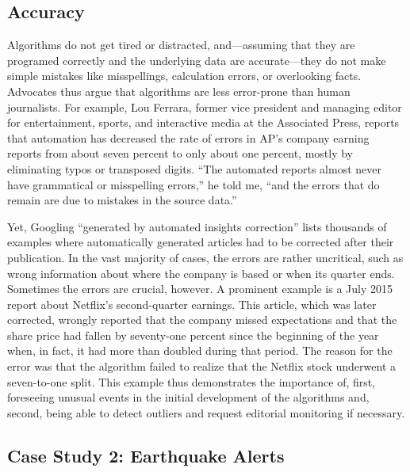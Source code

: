 \documentclass[notoc, symmetric, nobib, nols]{towcenter-guideto-book}
\begin{document}
\subsection{Accuracy}

Algorithms do not get tired or distracted, and---assuming that they are programed correctly and the underlying data are accurate---they do not make simple mistakes like misspellings, calculation errors, or overlooking facts. Advocates thus argue that algorithms are less error-prone than human journalists. For example, Lou Ferrara, former vice president and managing editor for entertainment, sports, and interactive media at the Associated Press, reports that automation has decreased the rate of errors in AP's company earning reports from about seven percent to only about one percent, mostly by eliminating typos or transposed digits. ``The automated reports almost never have grammatical or misspelling errors,'' he told me, ``and the errors that do remain are due to mistakes in the source data.''

Yet, Googling ``generated by automated insights correction'' lists thousands of examples where automatically generated articles had to be corrected after their publication.\autocite{diak15} In the vast majority of cases, the errors are rather uncritical, such as wrong information about where the company is based or when its quarter ends. Sometimes the errors are crucial, however. A prominent example is a July 2015 report about Netflix's second-quarter earnings.\autocite{ap15_2} This article, which was later corrected, wrongly reported that the company missed expectations and that the share price had fallen by seventy-one percent since the beginning of the year when, in fact, it had more than doubled during that period. The reason for the error was that the algorithm failed to realize that the Netflix stock underwent a seven-to-one split. This example thus demonstrates the importance of, first, foreseeing unusual events in the initial development of the algorithms and, second, being able to detect outliers and request editorial monitoring if necessary.\autocite{leco15}

\subsection{Case Study 2: Earthquake Alerts}
\end{document}
